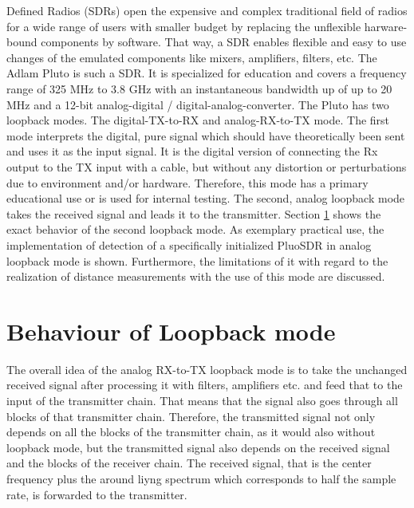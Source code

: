 \documentclass[journal]{IEEEtran}
\begin{document}
 Defined Radios (SDRs) open the expensive and complex traditional field of radios for a wide range of users with smaller budget by replacing the unflexible harware-bound components by software. That way, a SDR enables flexible and easy to use changes of the emulated components like mixers, amplifiers, filters, etc. The Adlam Pluto is such a SDR. It is specialized for education and covers a frequency range of 325 MHz to 3.8 GHz with an instantaneous bandwidth up of up to 20 MHz and a 12-bit analog-digital / digital-analog-converter. 
The Pluto has two loopback modes. The digital-TX-to-RX and analog-RX-to-TX mode. The first mode interprets the digital, pure signal which should have theoretically been sent and uses it as the input signal. It is the digital version of connecting the Rx output to the TX input with a cable, but without any distortion or perturbations due to environment and/or hardware. Therefore, this mode has a primary educational use or is used for internal testing. 
The second, analog loopback mode takes the received signal and leads it to the transmitter. Section \ref{sec:behaviourLoopback} shows the exact behavior of the second loopback mode. 
As exemplary practical use, the implementation of detection of a specifically initialized PluoSDR in analog loopback mode is shown. Furthermore, the limitations of it with regard to the realization of distance measurements with the use of this mode are discussed.


\section{Behaviour of Loopback mode}
\label{sec:behaviourLoopback}
The overall idea of the analog RX-to-TX loopback mode is to take the unchanged received signal after processing it with filters, amplifiers etc. and feed that to the input of the transmitter chain.
That means that the signal also goes through all blocks of that transmitter chain.
Therefore, the transmitted signal not only depends on all the blocks of the transmitter chain, as it would also without loopback mode, but the transmitted signal also depends on the received signal and the blocks of the receiver chain.
The received signal, that is the center frequency plus the around liyng spectrum which corresponds to half the sample rate, is forwarded to the transmitter.
\end{document}
